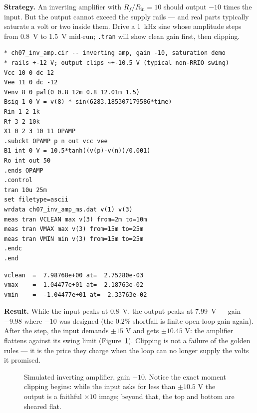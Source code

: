 \textbf{Strategy.} An inverting amplifier with $R_f/R_{\mathrm{in}} = 10$
should output $-10$ times the input. But the output cannot exceed the
supply rails — and real parts typically saturate a volt or two inside
them. Drive a \qty{1}{\kilo\hertz} sine whose amplitude steps from
\qty{0.8}{\volt} to \qty{1.5}{\volt} mid-run; \texttt{.tran} will show
clean gain first, then clipping.

\begin{lstlisting}[caption={\texttt{inv\_amp.cir} --- inverting amplifier,
input amplitude stepping $0.8 \to \qty{1.5}{\volt}$ at \qty{12}{\milli\second}},label={lst:invamp},abovecaptionskip=0pt]
* ch07_inv_amp.cir -- inverting amp, gain -10, saturation demo
* rails +-12 V; output clips ~+-10.5 V (typical non-RRIO swing)
Vcc 10 0 dc 12
Vee 11 0 dc -12
Venv 8 0 pwl(0 0.8 12m 0.8 12.01m 1.5)
Bsig 1 0 V = v(8) * sin(6283.185307179586*time)
Rin 1 2 1k
Rf 3 2 10k
X1 0 2 3 10 11 OPAMP
.subckt OPAMP p n out vcc vee
B1 int 0 V = 10.5*tanh((v(p)-v(n))/0.001)
Ro int out 50
.ends OPAMP
.control
tran 10u 25m
set filetype=ascii
wrdata ch07_inv_amp_ms.dat v(1) v(3)
meas tran VCLEAN max v(3) from=2m to=10m
meas tran VMAX max v(3) from=15m to=25m
meas tran VMIN min v(3) from=15m to=25m
.endc
.end
\end{lstlisting}

\begin{lstlisting}[caption={measured extrema (verbatim): clean region
then saturated region},abovecaptionskip=0pt]
vclean  =  7.98768e+00 at=  2.75280e-03
vmax    =  1.04477e+01 at=  2.18763e-02
vmin    =  -1.04477e+01 at=  2.33763e-02
\end{lstlisting}

\textbf{Result.} While the input peaks at \qty{0.8}{\volt}, the output
peaks at \qty{7.99}{\volt} — gain $-9.98$ where $-10$ was designed (the
$0.2\%$ shortfall is finite open-loop gain again). After the step, the
input demands $\pm 15$ V and gets $\pm 10.45$ V: the amplifier flattens
against its swing limit (Figure~\ref{fig:sat}). Clipping is not a
failure of the golden rules — it is the price they charge when the loop
can no longer supply the volts it promised.

\begin{figure}[htbp]
\centering

\caption{Simulated inverting amplifier, gain $-10$. Notice the exact
moment clipping begins: while the input asks for less than
$\pm 10.5$ V the output is a faithful $\times10$ image; beyond that, the
top and bottom are sheared flat.}
\label{fig:sat}
\end{figure}

